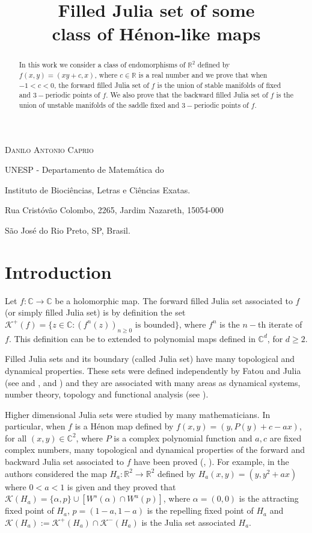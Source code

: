 \documentclass[11pt]{amsart}
\title[Filled Julia set of some class of H\'enon-like maps] %
      {Filled Julia set of some \\ class of H\'enon-like maps}
\author[Danilo Antonio Caprio]{}
\theoremstyle{definition}
\begin{document}
\maketitle

\centerline{\scshape Danilo Antonio Caprio}
\medskip
{\footnotesize
\centerline{UNESP - Departamento de Matem\'atica do}
\centerline{Instituto de Bioci\^encias, Letras e Ci\^encias Exatas.}
\centerline{Rua Crist\'ov\~ao Colombo, 2265, Jardim Nazareth, 15054-000}
\centerline{S\~ao Jos\'e do Rio Preto, SP, Brasil.}
}



\bigskip

\begin{abstract}
In this work we consider a class of endomorphisms of $\mathbb{R}^2$ defined by $f(x,y)=(xy+c,x)$, where $c\in\mathbb{R}$ is a real number and we prove that when $-1<c<0$, the forward filled Julia set of $f$ is the union of stable manifolds of fixed and $3-$periodic points of $f$. We also prove that the backward filled Julia set of $f$ is the union of unstable manifolds of the saddle fixed and $3-$periodic points of $f$.
\end{abstract}




\section{Introduction}

Let $f:\mathbb{C}\longrightarrow \mathbb{C}$ be a holomorphic map.
The forward filled Julia set associated to $f$ (or simply filled Julia set) is by definition the set
$\mathcal{K}^+(f)=\{z\in\mathbb{C}: (f^n(z))_{n\geq 0} \textrm{ is bounded}\}$, where $f^n$
is the $n-$th iterate of $f$. This definition can be to extended to polynomial maps defined in $\mathbb{C}^d$, for $d\geq 2$.

Filled Julia sets and its boundary (called Julia set) have many topological and dynamical properties.
These sets were defined independently by Fatou and Julia (see \cite{fatou19} and \cite{fatou21}, \cite{julia18} and \cite{julia22}) and they are associated with many areas as dynamical systems, number theory, topology and functional analysis (see \cite{dv}).

Higher dimensional Julia sets were studied by many mathematicians. In particular, when $f$ is a H\'enon map defined by
$f(x,y)=(y,P(y)+c-ax)$, for all $(x,y)\in \mathbb{C}^2$, where $P$ is a complex polynomial function and $a,c$ are fixed complex numbers, many topological and dynamical properties of the forward and backward Julia set associated to $f$ have been proved (\cite{bs}, \cite{fs}). For example, in \cite{hw} the authors considered the map $H_a:\mathbb{R}^2\longrightarrow \mathbb{R}^2$ defined by $H_a(x,y)=(y,y^2+ax)$ where $0<a<1$ is given and they proved that $\mathcal{K}(H_a)=\{\alpha,p\}\cup[W^s(\alpha)\cap W^u(p)]$, where $\alpha=(0,0)$ is the attracting fixed point of $H_a$, $p=(1-a,1-a)$ is the repelling fixed point of $H_a$ and $\mathcal{K}(H_a):=\mathcal{K}^+(H_a)\cap \mathcal{K}^-(H_a)$ is the Julia set associated $H_a$.
\end{document}
